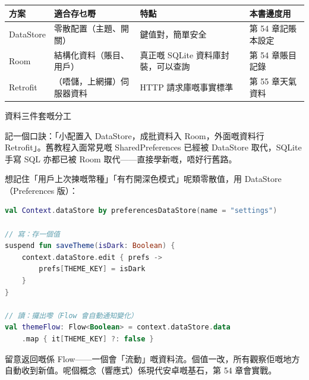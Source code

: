 


\begin{center}
\begin{tabularx}{\linewidth}{|X|X|X|X|}
\hline
\textbf{方案} & \textbf{適合存乜嘢} & \textbf{特點} & \textbf{本書邊度用} \tabularnewline
\hline
DataStore & 零散配置（主題、開關） & 鍵值對，簡單安全 & 第 54 章記賬本設定 \tabularnewline
Room & 結構化資料（賬目、用戶） & 真正嘅 SQLite 資料庫封裝，可以查詢 & 第 54 章賬目記錄 \tabularnewline
Retrofit & （唔儲，上網攞）伺服器資料 & HTTP 請求庫嘅事實標準 & 第 55 章天氣資料 \tabularnewline
\hline
\end{tabularx}
\end{center}

\begin{center}\small\color{gray}資料三件套嘅分工\end{center}

記一個口訣：「小配置入 DataStore，成批資料入 Room，外面嘅資料行 Retrofit」。舊教程入面常見嘅 SharedPreferences 已經被 DataStore 取代，SQLite 手寫 SQL 亦都已被 Room 取代——直接學新嘅，唔好行舊路。


想記住「用戶上次揀嘅幣種」「有冇開深色模式」呢類零散值，用 DataStore（Preferences 版）：

\begin{lstlisting}[language=Kotlin]
val Context.dataStore by preferencesDataStore(name = "settings")

// 寫：存一個值
suspend fun saveTheme(isDark: Boolean) {
    context.dataStore.edit { prefs ->
        prefs[THEME_KEY] = isDark
    }
}

// 讀：攞出嚟（Flow 會自動通知變化）
val themeFlow: Flow<Boolean> = context.dataStore.data
    .map { it[THEME_KEY] ?: false }
\end{lstlisting}

留意返回嘅係 Flow——一個會「流動」嘅資料流。個值一改，所有觀察佢嘅地方自動收到新值。呢個概念（響應式）係現代安卓嘅基石，第 54 章會實戰。


